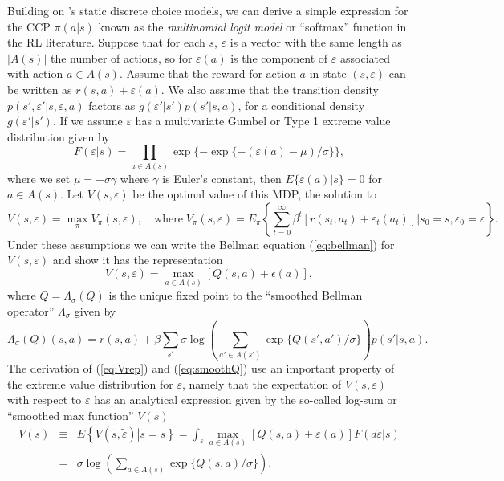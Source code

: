 Building on \citet{mcfadden:1973}'s static discrete choice
models, we can derive a simple expression for the CCP $\pi(a|s)$ known as 
the {\it multinomial logit model\/} or ``softmax'' function in the RL literature.
Suppose that for each $s$, $\varepsilon$ is a vector with the same length as $|A(s)|$ the number of actions, so for
$\varepsilon(a)$ is the component of $\varepsilon$ associated with action $a \in A(s)$. Assume that 
the reward for action $a$ in state $(s,\varepsilon)$ can be written as $r(s,a)+\varepsilon(a)$. 
We also assume that the transition density $p(s',\varepsilon'|s,\varepsilon,a)$ factors as $g(\varepsilon'|s')p(s'|s,a)$,
for a conditional density $g(\varepsilon'|s')$. If 
we assume $\varepsilon$ has a multivariate Gumbel or Type 1 extreme value distribution given by
\begin{equation}
    F(\varepsilon|s) = \prod_{a \in A(s)} \exp\{-\exp\{-(\varepsilon(a)-\mu)/\sigma\}\},
\label{eq:evd}
\end{equation}
where we set $\mu=-\sigma\gamma$ where $\gamma$ is Euler's constant, then $E\{\varepsilon(a)|s\}=0$ for $a \in A(s)$. 
Let $V(s,\varepsilon)$ be the optimal value of this MDP, the solution to
\begin{equation}
       V(s,\varepsilon)=\max_\pi  V_\pi(s,\varepsilon),  \quad \mbox{where} \;  V_\pi(s,\varepsilon) = E_\pi \left\{\sum_{t=0}^\infty \beta^t[r(s_t,a_t)+\varepsilon_t(a_t)]|s_0=s,\varepsilon_0=\varepsilon\right\}.
\label{eq:smoothVeps}
\end{equation}
Under these assumptions we can write the Bellman equation (\ref{eq:bellman}) for $V(s,\varepsilon)$ and show it 
has the representation
\begin{equation} V(s,\varepsilon)=\max_{a \in A(s)}[Q(s,a)+\epsilon(a)],
\label{eq:Vrep}
\end{equation}
where $Q=\Lambda_\sigma(Q)$ is the unique fixed point to the ``smoothed Bellman operator'' $\Lambda_\sigma$ given by
\begin{equation}
    \Lambda_\sigma(Q)(s,a) = r(s,a) + \beta \sum_{s'} \sigma \log\left(\sum_{a' \in A(s')} \exp\{Q(s',a')/\sigma\}\right)p(s'|s,a).
\label{eq:smoothQ}
\end{equation}
The derivation of (\ref{eq:Vrep}) and (\ref{eq:smoothQ}) use an important
property of the extreme value distribution for $\varepsilon$, namely that the expectation of $V(s,\varepsilon)$ with respect to $\varepsilon$
has an  analytical expression given by the so-called log-sum or ``smoothed max function'' $V(s)$ 
\begin{eqnarray}
    V(s) &\equiv &  E\left\{V(\tilde s,\tilde \varepsilon)\left|\tilde s=s\right\}\right. 
    =  \int_\varepsilon \max_{a \in A(s)} \left[Q(s,a)+\varepsilon(a)\right]F(d\varepsilon|s) \nonumber \\ 
    &=&  \sigma \log\left(\sum_{a\in A(s)} \exp\{Q(s,a)/\sigma\}\right).
\label{eq:smoothV}
\end{eqnarray}
